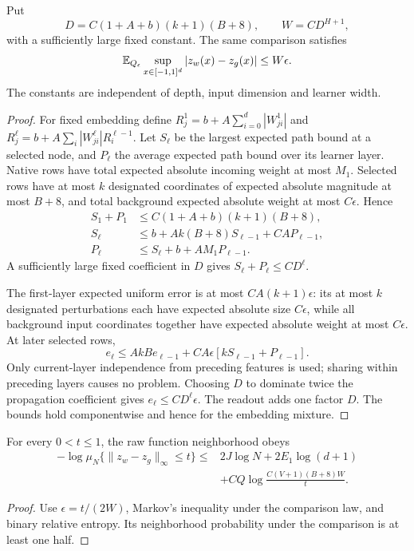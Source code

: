 \begin{lemma}
\label{lem:dag-uniform-error}
Put
\[
 D=C(1+A+b)(k+1)(B+8),\qquad W=C D^{H+1},
\]
with a sufficiently large fixed constant. The same comparison satisfies
\[
 \mathbb E_{Q_\epsilon}\sup_{x\in[-1,1]^d}|z_w(x)-z_g(x)|
       \le W\epsilon.
\]
The constants are independent of depth, input dimension and learner width.
\end{lemma}
\begin{proof}
For fixed embedding define $R_j^1=b+A\sum_{i=0}^d|W^1_{ji}|$ and $R_j^\ell=b+A\sum_i|W^\ell_{ji}|R_i^{\ell-1}$. Let $S_\ell$ be the largest expected path bound at a selected node, and $P_\ell$ the average expected path bound over its learner layer. Native rows have total expected absolute incoming weight at most $M_1$. Selected rows have at most $k$ designated coordinates of expected absolute magnitude at most $B+8$, and total background expected absolute weight at most $C\epsilon$. Hence
\begin{align*}
 S_1+P_1&\le C(1+A+b)(k+1)(B+8),\\
 S_\ell&\le b+Ak(B+8)S_{\ell-1}+CA P_{\ell-1},\\
 P_\ell&\le S_\ell+b+AM_1P_{\ell-1}.
\end{align*}
A sufficiently large fixed coefficient in $D$ gives $S_\ell+P_\ell\le C D^\ell$.

The first-layer expected uniform error is at most $CA(k+1)\epsilon$: its at most $k$ designated perturbations each have expected absolute size $C\epsilon$, while all background input coordinates together have expected absolute weight at most $C\epsilon$. At later selected rows,
\[
 e_\ell\le AkB e_{\ell-1}
             +CA\epsilon[kS_{\ell-1}+P_{\ell-1}].
\]
Only current-layer independence from preceding features is used; sharing within preceding layers causes no problem. Choosing $D$ to dominate twice the propagation coefficient gives $e_\ell\le C D^\ell\epsilon$. The readout adds one factor $D$. The bounds hold componentwise and hence for the embedding mixture.
\end{proof}

\begin{corollary}
\label{cor:dag-mass}
For every $0<t\le1$, the raw function neighborhood obeys
\begin{align*}
 -\log\mu_N\{\|z_w-z_g\|_\infty\le t\}
 \le{}&2J\log N+2E_1\log(d+1)\\
 &+C Q\log\frac{C(V+1)(B+8)W}{t}.
\end{align*}
\end{corollary}
\begin{proof}
Use $\epsilon=t/(2W)$, Markov's inequality under the comparison law, and binary relative entropy. Its neighborhood probability under the comparison is at least one half.
\end{proof}
